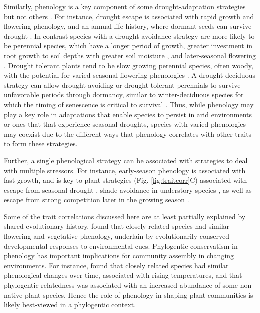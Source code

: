 \documentclass[11pt]{article}
\newcommand{\R}[1]{\label{}\linelabel{#1}}
\begin{document}
Similarly, phenology is a key component of some drought-adaptation strategies but not others \citep{kooyers2015evolution}. For instance, drought escape is associated with rapid growth and flowering phenology, and an annual life history, where dormant seeds can survive drought \citep{fox1992evolution}. In contrast species with a drought-avoidance strategy are more likely to be perennial species, which have a longer period of growth, greater investment in root growth to soil depths with greater soil moisture \citep{padilla2007rooting}, and later-seasonal flowering \citep{seabloom2003invasion}. Drought tolerant plants tend to be slow growing perennial species, often woody, with the potential for varied seasonal flowering phenologies \citep{williams1997leaf}.  A drought deciduous strategy can allow drought-avoiding or drought-tolerant perennials to survive unfavorable periods through dormancy, similar to winter-deciduous species for which the timing of senescence is critical to survival \citep{gillespie2017winter}. Thus, while phenology may play a key role in adaptations that enable species to persist in arid environments or ones that that experience seasonal droughts, species with varied phenologies may coexist due to the different ways that phenology correlates with other traits to form these strategies.

Further, a single phenological strategy can be associated with strategies to deal with multiple stressors.  For instance, early-season phenology is associated with fast growth, and is key to plant strategies (Fig. \ref{fig:traitcorr}C) associated with escape from seasonal drought \citep{blumenthal2020traits}, shade avoidance in understory species \citep{augspurger2005light}, as well as escape from strong competition later in the growing season \citep{gioria2014resource, godoy2014}.

\R{phylo1} Some of the trait correlations discussed here are at least partially explained by shared evolutionary history. \citet{davies2013} found that closely related species had similar flowering and vegetative phenology, underlain by evolutionarily conserved developmental responses to environmental cues. Phylogentic conservatism in phenology has important implications for community assembly in changing environments. For instance, \citet{davis2010importance} found that closely related species had similar phenological changes over time, associated with rising temperatures, and that phylogentic relatedness was associated with an increased abundance of some non-native plant species. Hence the role of phenology in shaping plant communities is likely best-viewed in a phylogentic context. \R{phylo2} %
\end{document}
